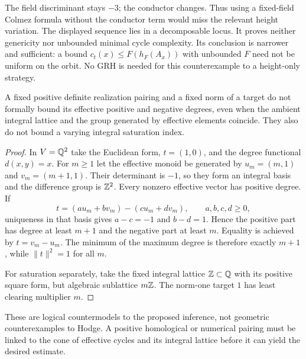 The field discriminant stays $-3$; the conductor changes. Thus using a fixed-field Colmez formula without the conductor term would miss the relevant height variation. The displayed sequence lies in a decomposable locus. It proves neither genericity nor unbounded minimal cycle complexity. Its conclusion is narrower and sufficient: a bound $c_t(x)\le F(h_F(A_x))$ with unbounded $F$ need not be uniform on the orbit. No GRH is needed for this counterexample to a height-only strategy.

\begin{proposition}\label{A3}
A fixed positive definite realization pairing and a fixed norm of a target do not formally bound its effective positive and negative degrees, even when the ambient integral lattice and the group generated by effective elements coincide. They also do not bound a varying integral saturation index.
\end{proposition}
\begin{proof}
In $V=\mathbb Q^2$ take the Euclidean form, $t=(1,0)$, and the degree functional $d(x,y)=x$. For $m\ge1$ let the effective monoid be generated by $u_m=(m,1)$ and $v_m=(m+1,1)$. Their determinant is $-1$, so they form an integral basis and the difference group is $\mathbb Z^2$. Every nonzero effective vector has positive degree. If
\[
 t=(a u_m+b v_m)-(c u_m+d v_m),\qquad a,b,c,d\ge0,
\]
uniqueness in that basis gives $a-c=-1$ and $b-d=1$. Hence the positive part has degree at least $m+1$ and the negative part at least $m$. Equality is achieved by $t=v_m-u_m$. The minimum of the maximum degree is therefore exactly $m+1$, while $\|t\|^2=1$ for all $m$.

For saturation separately, take the fixed integral lattice $\mathbb Z\subset\mathbb Q$ with its positive square form, but algebraic sublattice $m\mathbb Z$. The norm-one target $1$ has least clearing multiplier $m$.
\end{proof}

These are logical countermodels to the proposed inference, not geometric counterexamples to Hodge. A positive homological or numerical pairing must be linked to the cone of effective cycles and its integral lattice before it can yield the desired estimate.

